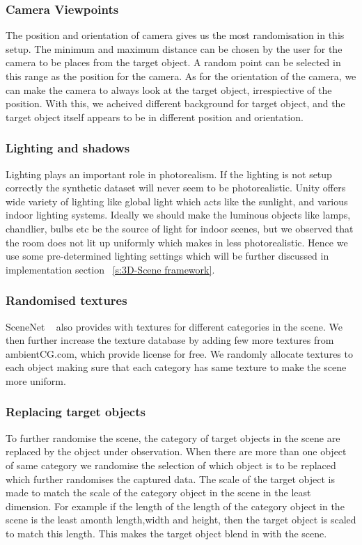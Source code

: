 \subsubsection{Camera Viewpoints}
The position and orientation of camera gives us the most randomisation in this setup.
The minimum and maximum distance can be chosen by the user for the camera to be places from the target object.
A random point can be selected in this range as the position for the camera.
As for the orientation of the camera, we can make the camera to always look at the target object, irrespiective of the position.
With this, we acheived different background for target object, and the target object itself appears to be in different position and orientation.

\subsubsection{Lighting and shadows}
Lighting plays an important role in photorealism. If the lighting is not setup correctly the synthetic dataset will never seem to be photorealistic.
Unity offers wide variety of lighting like global light which acts like the sunlight, and various indoor lighting systems.
Ideally we should make the luminous objects like lamps, chandlier, bulbs etc be the source of light for indoor scenes, but we observed that the room does not lit up uniformly which makes in less photorealistic.
Hence we use some pre-determined lighting settings which will be further discussed in implementation section ~\ref{s:3D-Scene framework}.

\subsubsection{Randomised textures}
SceneNet ~\cite{McCormac:etal:ICCV2017} also provides with textures for different categories in the scene.
We then further increase the texture database by adding few more textures from ambientCG.com, which provide license for free.
We randomly allocate textures to each object making sure that each category has same texture to make the scene more uniform.

\subsubsection{Replacing target objects}
To further randomise the scene, the category of target objects in the scene are replaced by the object under observation.
When there are more than one object of same category we randomise the selection of which object is to be replaced which further randomises the captured data.
The scale of the target object is made to match the scale of the category object in the scene in the least dimension.
For example if the length of the length of the category object in the scene is the least amonth length,width and height, then the target object is scaled to match this length.
This makes the target object blend in with the scene.

